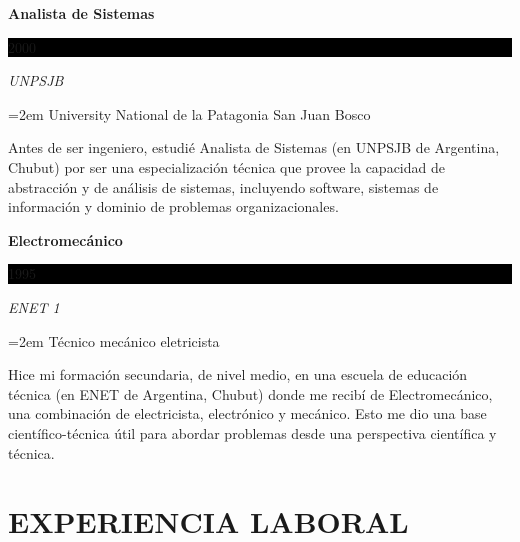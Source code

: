 \documentclass[paper=a4,fontsize=11pt]{scrartcl} %
\newcommand{\sepspace}{\vspace*{1em}}		%
\newcommand{\NewPart}[1]{\section*{\uppercase{#1}}}
\newcommand{\EducationEntry}[4]{
		\noindent \textbf{#1} \hfill      %
		\colorbox{Black}{%
			\parbox{6em}{%
			\hfill\color{White}#2}} \par  %
		\noindent \textit{#3} \par        %
		\noindent\hangindent=2em\hangafter=0 \small #4 %
		\normalsize \par}
\begin{document}
\EducationEntry{Analista de Sistemas}{2000}{UNPSJB}
{University National de la Patagonia San Juan Bosco}

Antes de ser ingeniero, estudié Analista de Sistemas (en UNPSJB de Argentina, Chubut) por ser una especialización técnica que provee la capacidad de abstracción y de análisis de sistemas, incluyendo software, sistemas de información y dominio de problemas organizacionales. 
\sepspace

\EducationEntry{Electromecánico}{1995}{ENET 1}
{Técnico mecánico eletricista}

Hice mi formación secundaria, de nivel medio, en una escuela de educación técnica (en ENET de Argentina, Chubut) donde me recibí de Electromecánico, una combinación de electricista, electrónico y mecánico. Esto me dio una base científico-técnica útil para abordar problemas desde una perspectiva científica y técnica.
\sepspace

\NewPart{Experiencia laboral}{}
\end{document}
